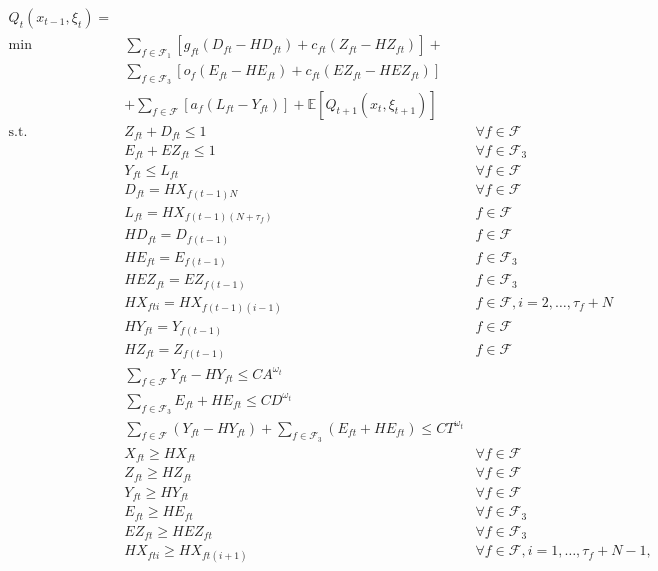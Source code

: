 \documentclass[12pt]{article}
\begin{document}
	\begin{subequations}
		\begin{align}
		Q_t(x_{t-1}, \xi_t)  = & &\\
		\min \quad & \sum_{f \in \mathcal{F}_1} \left[ g_{ft} (D_{ft} - HD_{ft}) + c_{ft} (Z_{ft} - HZ_{ft}) \right]  + & \nonumber \\
		& \sum_{f \in \mathcal{F}_3} \left[ o_f(E_{ft} - HE_{ft}) + c_{ft}(EZ_{ft} - HEZ_{ft}) \right]& \nonumber\\ 
		& +\sum_{f \in \mathcal{F}} \left[ a_f (L_{ft} - Y_{ft})\right]  + \mathbb{E}\left[Q_{t+1}(x_{t},\xi_{t+1}) \right] &\\
		\text{s.t.} \quad & Z_{ft} + D_{ft} \leq 1 & \forall f \in \mathcal{F}\\
		& E_{ft} + EZ_{ft} \leq 1 & \forall f \in \mathcal{F}_3\\
		& Y_{ft} \leq L_{ft} & \forall f \in \mathcal{F}\\
		& D_{ft} = HX_{f(t-1)N} & \forall f \in \mathcal{F}\\
		& L_{ft} = HX_{f(t-1)(N+\tau_{f})}& f \in \mathcal{F}\\
		& HD_{ft} = D_{f(t-1)} & f \in \mathcal{F}\\
		& HE_{ft} = E_{f(t-1)} & f \in \mathcal{F}_3\\
		& HEZ_{ft} = EZ_{f(t-1)} & f \in \mathcal{F}_3\\
		& HX_{fti} = HX_{f(t-1)(i-1)} & f \in \mathcal{F}, i = 2, \dots, \tau_{f} + N\\
		& HY_{ft} = Y_{f(t-1)} & f \in \mathcal{F}\\
		& HZ_{ft} = Z_{f(t-1)} & f \in \mathcal{F}\\
		& \sum_{f \in \mathcal{F}} Y_{ft} - HY_{ft} \leq CA^{\omega_t} &\\
		& \sum_{f \in \mathcal{F}_3} E_{ft} + HE_{ft} \leq CD^{\omega_t} &\\
		& \sum_{f \in \mathcal{F}} (Y_{ft} - HY_{ft}) + \sum_{f \in \mathcal{F}_3} (E_{ft} + HE_{ft}) \leq CT^{\omega_t} &\\
		& X_{ft} \geq HX_{ft} & \forall f \in \mathcal{F}\\
		& Z_{ft} \geq HZ_{ft} & \forall f \in \mathcal{F}\\
		& Y_{ft} \geq HY_{ft} & \forall f \in \mathcal{F}\\
		& E_{ft} \geq HE_{ft} & \forall f \in \mathcal{F}_3\\
		& EZ_{ft} \geq HEZ_{ft} & \forall f \in \mathcal{F}_3\\
		& HX_{fti} \geq HX_{ft(i+1)} & \forall f \in \mathcal{F}, i = 1, \dots, \tau_{f} + N -1,
		\end{align}
	\end{subequations}
\end{document}
